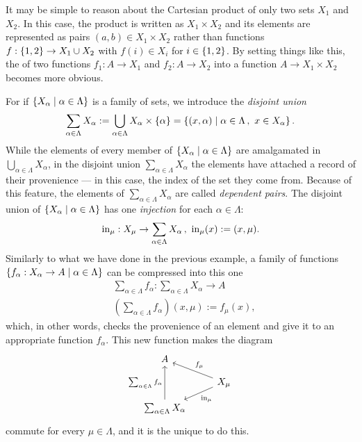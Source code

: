 \begin{exercise}
  It may be simple to reason about the Cartesian product of only two
  sets \(X_1\) and \(X_2\). In this case, the product is written as
  \(X_1 \times X_2\) and its elements are represented as pairs
  \((a, b) \in X_1 \times X_2\) rather than functions
  \(f : \left\{1, 2\right\} \to X_1 \cup X_2\) with \(f(i) \in X_i\) for
  \(i \in \left\{1, 2\right\}\). By setting things like this, the 
  of two functions \(f_1 : A \to X_1\) and \(f_2 : A \to X_2\) into a
  function \(A \to X_1 \times X_2\) becomes more obvious.
\end{exercise}

\begin{example}\label{example:CoprodOfSets}
  For if \(\left\{X_\alpha \mid \alpha \in \Lambda\right\}\) is a family of sets, we introduce the
  {\em disjoint union}
  \[\sum_{\alpha \in \Lambda} X_\alpha := \bigcup_{\alpha \in \Lambda} X_\alpha \times \left\{\alpha\right\} = \left\{(x, \alpha) \mid \alpha \in \Lambda\,,
      \ x \in X_\alpha\right\} .\] While the elements of every member of
  \(\left\{X_\alpha \mid \alpha \in \Lambda\right\}\) are amalgamated in
  \(\bigcup_{\alpha \in \Lambda} X_\alpha\), in the disjoint union
  \(\sum_{\alpha \in \Lambda} X_\alpha\) the elements have attached a record of their
  provenience --- in this case, the index of the set they come
  from. Because of this feature, the elements of
  \(\sum_{\alpha \in \Lambda} X_\alpha\) are called {\em dependent pairs}. The disjoint
  union of \(\left\{X_\alpha \mid \alpha \in \Lambda\right\}\) has one {\em injection} for each
  \(\alpha \in \Lambda\):
  \[\operatorname{in}_\mu : X_\mu \to \sum_{\alpha \in \Lambda} X_\alpha\,, \ \operatorname{in}_\mu(x) := (x, \mu) .\]
  Similarly to what we have done in the previous example, a family of
  functions
  \(\left\{f_\alpha : X_\alpha \to A \mid \alpha \in \Lambda\right\}\) can be compressed into this one
  \begin{align*}
    & \sum_{\alpha \in \Lambda} f_\alpha : \sum_{\alpha \in \Lambda} X_\alpha \to A \\
    & \left(\sum_{\alpha \in \Lambda} f_\alpha\right) (x, \mu) := f_\mu(x) ,
  \end{align*}
  which, in other words, checks the provenience of an element and give
  it to an appropriate function \(f_\alpha\). This new function makes the
  diagram
  \[\begin{tikzcd}[row sep=small]
      A \\
      & X_\mu \ar["{\inj_\mu}", dl] \ar["{f_\mu}", ul, swap] \\
      \sum_{\alpha \in \Lambda} X_\alpha \ar["{\sum_{\alpha \in \Lambda} f_\alpha}", uu]
    \end{tikzcd}\] commute for every \(\mu \in \Lambda\), and it is the unique
  to do this.%
\end{example}

